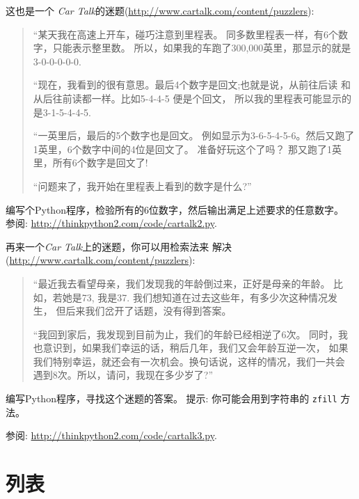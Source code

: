 \documentclass[10pt]{book}
\begin{document}
\begin{exercise}
这也是一个 {\em Car Talk}的迷题(\url{http://www.cartalk.com/content/puzzlers}):

\begin{quote}

``某天我在高速上开车，碰巧注意到里程表。
同多数里程表一样，有6个数字，只能表示整里数。
所以，如果我的车跑了300,000英里，那显示的就是
3-0-0-0-0-0.

``现在，我看到的很有意思。最后4个数字是回文;也就是说，从前往后读
和从后往前读都一样。比如5-4-4-5 便是个回文，
所以我的里程表可能显示的是3-1-5-4-4-5.

``一英里后，最后的5个数字也是回文。
例如显示为3-6-5-4-5-6。然后又跑了1英里，6个数字中间的4位是回文了。
准备好玩这个了吗？ 那又跑了1英里，所有6个数字是回文了!

``问题来了，我开始在里程表上看到的数字是什么?''
\end{quote}

编写个Python程序，检验所有的6位数字，然后输出满足上述要求的任意数字。
参阅: \url{http://thinkpython2.com/code/cartalk2.py}.

\end{exercise}


\begin{exercise}
再来一个{\em Car Talk}上的迷题，你可以用检索法来
解决 (\url{http://www.cartalk.com/content/puzzlers}):

\begin{quote}
``最近我去看望母亲，我们发现我的年龄倒过来，正好是母亲的年龄。
比如，若她是73, 我是37. 我们想知道在过去这些年，有多少次这种情况发生，
但后来我们岔开了话题，没有得到答案。

``我回到家后，我发现到目前为止，我们的年龄已经相逆了6次。
同时，我也意识到，如果我们幸运的话，稍后几年，我们又会年龄互逆一次，
如果我们特别幸运，就还会有一次机会。换句话说，这样的情况，我们一共会
遇到8次。所以，请问，我现在多少岁了?''

\end{quote}

编写Python程序，寻找这个迷题的答案。
提示: 你可能会用到字符串的 {\tt zfill} 方法。

参阅: \url{http://thinkpython2.com/code/cartalk3.py}.

\end{exercise}



\chapter{列表}
\end{document}
